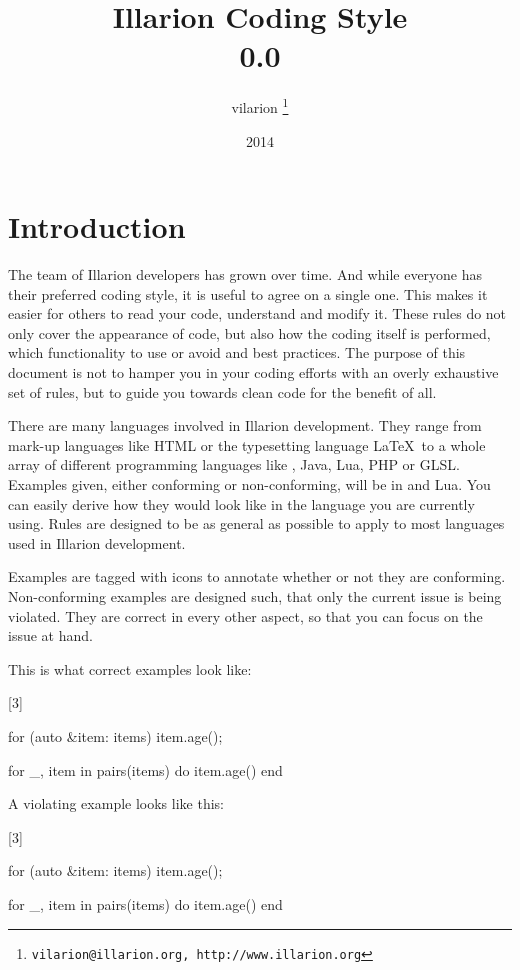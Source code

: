 \documentclass[a4paper,11pt]{scrreprt}
\def\ifmonospace{\ifdim\fontdimen3\font=0pt}
\def\Cpp{%
\ifmonospace%
    C++%
\else%
    \mbox{C\kern-.1667em\raise.30ex\hbox{\smaller{++}}}%
\fi%
\xspace}
\newcommand{\marginMarker}[1]{%
\marginnote{%
    \hfill%
		\Huge{#1}%
}[3\baselineskip]%
}
\newcommand{\conforming}{%
\marginMarker{\textcolor{green}{\ding{51}}}%
}
\newcommand{\nonconforming}{%
\marginMarker{\textcolor{red}{\ding{55}}}%
}
\begin{document}
\title{Illarion Coding Style\\0.0}
\author{vilarion \thanks{ \texttt{vilarion@illarion.org, http://www.illarion.org}}}
\date{2014}
\maketitle
\tableofcontents

\chapter{Introduction}
The team of Illarion developers has grown over time. And while everyone has their preferred coding style, it is useful to agree on a single one. This makes it easier for others to read your code, understand and modify it. These rules do not only cover the appearance of code, but also how the coding itself is performed, which functionality to use or avoid and best practices. The purpose of this document is not to hamper you in your coding efforts with an overly exhaustive set of rules, but to guide you towards clean code for the benefit of all.

There are many languages involved in Illarion development. They range from mark-up languages like HTML or the typesetting language \LaTeX\ to a whole array of different programming languages like \Cpp, Java, Lua, PHP or GLSL. Examples given, either conforming or non-conforming, will be in \Cpp and Lua. You can easily derive how they would look like in the language you are currently using. Rules are designed to be as general as possible to apply to most languages used in Illarion development.

Examples are tagged with icons to annotate whether or not they are conforming. Non-conforming examples are designed such, that only the current issue is being violated. They are correct in every other aspect, so that you can focus on the issue at hand.

This is what correct examples look like:

\conforming{}
\begin{cppBox}
for (auto &item: items) {
    item.age();
}
\end{cppBox}
\begin{luaBox}
for _, item in pairs(items) do
    item.age()
end
\end{luaBox}

A violating example looks like this:

\nonconforming{}
\begin{cppBox}
for (auto &item: items)
{
    item.age();
}
\end{cppBox}
\begin{luaBox}
for _, item in pairs(items)
do
    item.age()
end
\end{luaBox}
\end{document}
